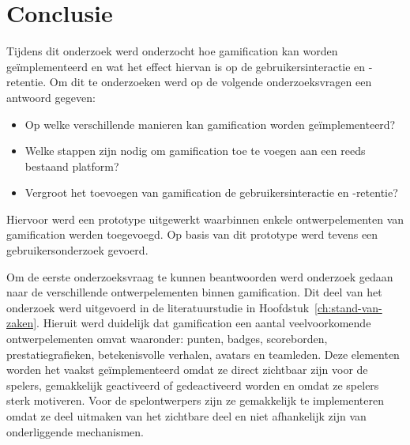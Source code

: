 
\chapter{Conclusie}
\label{ch:conclusie}


Tijdens dit onderzoek werd onderzocht hoe gamification kan worden geïmplementeerd en wat het effect hiervan is op de gebruikersinteractie en -retentie. Om dit te onderzoeken werd op de volgende onderzoeksvragen een antwoord gegeven:

\begin{itemize}
    \item Op welke verschillende manieren kan gamification worden geïmplementeerd?
    \item Welke stappen zijn nodig om gamification toe te voegen aan een reeds bestaand platform?
    \item Vergroot het toevoegen van gamification de gebruikersinteractie en -retentie?
\end{itemize}

Hiervoor werd een prototype uitgewerkt waarbinnen enkele ontwerpelementen van gamification werden toegevoegd. Op basis van dit prototype werd tevens een gebruikersonderzoek gevoerd.

Om de eerste onderzoeksvraag te kunnen beantwoorden werd onderzoek gedaan naar de verschillende ontwerpelementen binnen gamification. Dit deel van het onderzoek werd uitgevoerd in de literatuurstudie in Hoofdstuk~\ref{ch:stand-van-zaken}. Hieruit werd duidelijk dat gamification een aantal veelvoorkomende ontwerpelementen omvat waaronder: punten, badges, scoreborden, prestatiegrafieken, betekenisvolle verhalen, avatars en teamleden. Deze elementen worden het vaakst geïmplementeerd omdat ze direct zichtbaar zijn voor de spelers, gemakkelijk geactiveerd of gedeactiveerd worden en omdat ze spelers sterk motiveren. Voor de spelontwerpers zijn ze gemakkelijk te implementeren omdat ze deel uitmaken van het zichtbare deel en niet afhankelijk zijn van onderliggende mechanismen.

